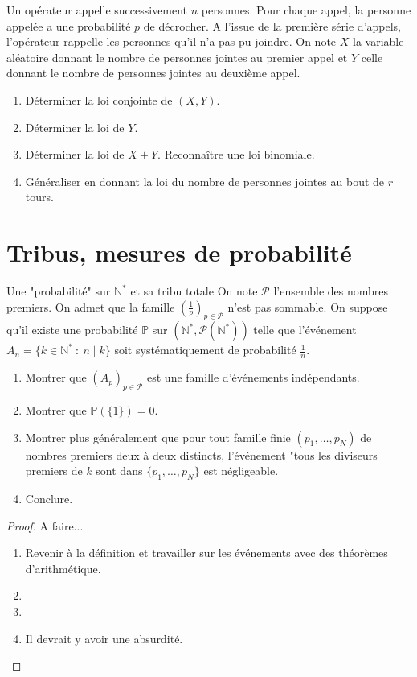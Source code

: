 \documentclass[french,a4paper]{article}
\renewcommand{\P}{\mathbb{P}}
\newcommand{\N}{\mathbb{N}}
\newcommand{\st}{^*}
\theoremstyle{plain}
\theoremstyle{definition}
\theoremstyle{remark}
\begin{document}
\begin{ex}[Moulin.27]{}
	Un opérateur appelle successivement $n$ personnes. Pour chaque appel, la personne appelée a une probabilité $p$ de décrocher. A l'issue de la première série d'appels, l'opérateur rappelle les personnes qu'il n'a pas pu joindre. On note $X$ la variable aléatoire donnant le nombre de personnes jointes au premier appel et $Y$ celle donnant le nombre de personnes jointes au deuxième appel.
	\begin{enumerate}
		\item Déterminer la loi conjointe de $(X,Y)$.
		\item Déterminer la loi de $Y$.
		\item Déterminer la loi de $X+Y$. Reconnaître une loi binomiale.
		\item Généraliser en donnant la loi du nombre de personnes jointes au bout de $r$ tours.
	\end{enumerate}
\end{ex}

\section{Tribus, mesures de probabilité}

\begin{ex}[Moulin.28]{Une "probabilité" sur $\N\st$ et sa tribu totale}
	On note $\mathcal{P}$ l'ensemble des nombres premiers. On admet que la famille $\displaystyle\left(\frac{1}{p}\right)_{p\in\mathcal{P}}$ n'est pas sommable. On suppose qu'il existe une probabilité $\P$ sur $(\N\st,\mathcal{P}(\N\st))$ telle que l'événement $A_n=\{k\in\N\st\ : \ n\mid k\}$ soit systématiquement de probabilité $\displaystyle\frac{1}{n}$.
	\begin{enumerate}
		\item Montrer que $(A_p)_{p\in\mathcal{P}}$ est une famille d'événements indépendants.
		\item Montrer que $\P(\{1\})=0$.
		\item Montrer plus généralement que pour tout famille finie $(p_1,\ldots,p_N)$ de nombres premiers deux à deux distincts, l'événement "tous les diviseurs premiers de $k$ sont dans $\{p_1,\ldots,p_N\}$ est négligeable.
		\item Conclure.
	\end{enumerate}
\end{ex}
\begin{proof}
	A faire...
	\begin{enumerate}
		\item Revenir à la définition et travailler sur les événements avec des théorèmes d'arithmétique.
		\item 
		\item 
		\item Il devrait y avoir une absurdité.
	\end{enumerate}
\end{proof}
\end{document}
